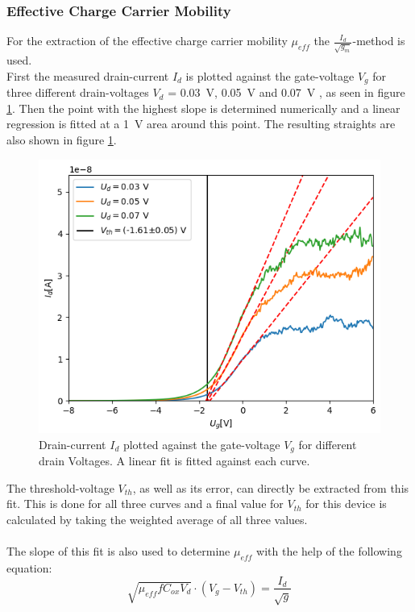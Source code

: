 \documentclass[%
 reprint,
amsmath,amssymb,
pra,
]{revtex4-1}
\begin{document}
\subsubsection{Effective Charge Carrier Mobility}
For the extraction of the effective charge carrier mobility $\mu_{eff}$ the $\frac{I_d}{\sqrt{g_m}}$-method is used.\\
First the measured drain-current $I_d$ is plotted against the gate-voltage $V_g$ for three different drain-voltages $V_d$ = \SI{0.03}{V}, \SI{0.05}{V} and \SI{0.07}{V} , as seen in figure \ref{fig:linreg1}. Then the point with the highest slope is determined numerically and a linear regression is fitted at a \SI{1}{\volt} area around this point. The resulting straights are also shown in figure \ref{fig:linreg1}.
\begin{figure}[h]
\centering
\includegraphics[scale=0.55]{Bilder/linreg.png}
\caption{Drain-current $I_d$ plotted against the gate-voltage $V_g$ for different drain Voltages. A linear fit is fitted against each curve.}
\label{fig:linreg1}
\end{figure}

The threshold-voltage $V_{th}$, as well as its error, can directly be extracted from this fit. This is done for all three curves and a final value for $V_{th}$ for this device is calculated by taking the weighted average of all three values.\\
\\
The slope of this fit is also used to determine $\mu_{eff}$ with the help of the following equation:
\begin{equation}
\sqrt{\mu_{eff} f C_{ox} V_d} \cdot (V_g-V_{th}) = \dfrac{I_d}{\sqrt{g}}
\end{equation}
\end{document}
